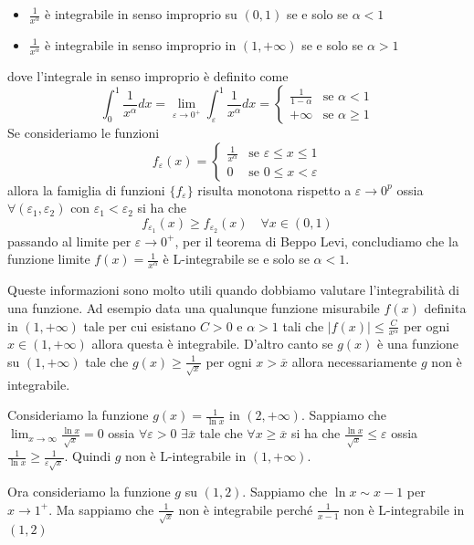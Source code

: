 \begin{itemize}[label = --]
    \item \(\frac{1}{x^{\alpha}}\) è integrabile in senso improprio su
        \({(0,1)}\) se e solo se \(\alpha<1\) 
    \item \(\frac{1}{x^{\alpha}}\) è integrabile in senso improprio in
        \({(1,+\infty)}\) se e solo se \(\alpha>1\)
\end{itemize}
dove l'integrale in senso improprio è definito come
\[
    \int_{0}^{1} \frac{1}{x^{\alpha}} dx = \lim_{\varepsilon \to 0^{+}}
    \int_{\varepsilon}^{1} \frac{1}{x^{\alpha}} dx = \begin{cases}
        \frac{1}{1-\alpha} & \text{se } \alpha < 1 \\
        +\infty & \text{se } \alpha \ge 1
    \end{cases}
\]
Se consideriamo le funzioni
\[
    f_{\varepsilon} {(x)} = \begin{cases}
        \frac{1}{x^{\alpha}} & \text{se } \varepsilon \le x\le 1 \\
        0 & \text{se } 0 \le x < \varepsilon
    \end{cases}
\]
allora la famiglia di funzioni \(\{f_\varepsilon\} \) risulta monotona rispetto
a \(\varepsilon \to 0^{p}\) ossia \(\forall {(\varepsilon_{1},
\varepsilon_{2})}\) con \(\varepsilon_{1} < \varepsilon_{2}\) si ha che 
\[
    f_{\varepsilon_{1}}{(x)} \ge f_{\varepsilon_{2}}{(x)} \quad \forall x \in
    {(0,1)}
\]
passando al limite per \(\varepsilon \to 0^{+}\), per il teorema di Beppo
Levi, concludiamo che la funzione limite \(f{(x)} = \frac{1}{x^{\alpha}}\) è
L-integrabile se e solo se \(\alpha < 1\).

Queste informazioni sono molto utili quando dobbiamo valutare l'integrabilità di
una funzione. Ad esempio data una qualunque funzione misurabile \(f{(x)}\)
definita in \({(1, +\infty)}\) tale per cui esistano \(C > 0\) e \(\alpha > 1\)
tali che \(\left| f{(x)} \right| \le \frac{C}{x^{\alpha}}\) per ogni \(x \in
{(1, +\infty)}\) allora questa è integrabile. D'altro canto se \(g{(x)}\) è una
funzione su \({(1, +\infty)}\) tale che \(g{(x)} \ge \frac{1}{\sqrt{x}}\) per
ogni \(x > \overline{x}\) allora necessariamente \(g\) non è integrabile.

\begin{example}
    Consideriamo la funzione \(g{(x)} = \frac{1}{\ln x}\) in \((2,
    +\infty)\). Sappiamo che \(\lim_{x \to \infty} \frac{\ln x}{\sqrt{x}} = 0\) ossia
    \(\forall \varepsilon > 0\) \(\exists \overline{x}\) tale che \(\forall x \ge
    \overline{x}\) si ha che \(\frac{\ln x}{\sqrt{x}} \le \varepsilon\) ossia
    \(\frac{1}{\ln x} \ge \frac{1}{\varepsilon \sqrt{x}}\). Quindi \(g\) non è
    L-integrabile in \((1, +\infty)\). 

    Ora consideriamo la funzione \(g\) su \({(1, 2)}\). Sappiamo che \(\ln x
    \sim x- 1\) per \(x \to 1^{+}\). Ma sappiamo che \(\frac{1}{\sqrt{x}}\) non
    è integrabile perché \(\frac{1}{x-1}\) non è L-integrabile in \({(1, 2)}\) 
\end{example}

